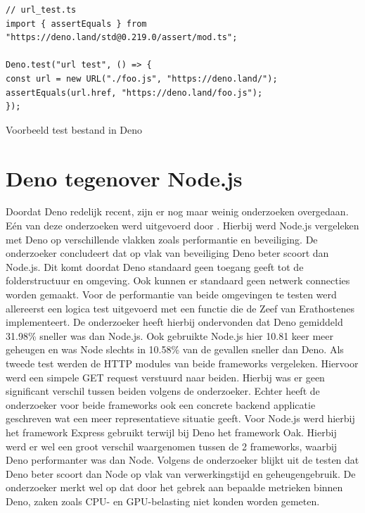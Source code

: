 \begin{listing}[H]
    \centering
    \begin{verbatim}
// url_test.ts
import { assertEquals } from "https://deno.land/std@0.219.0/assert/mod.ts";

Deno.test("url test", () => {
const url = new URL("./foo.js", "https://deno.land/");
assertEquals(url.href, "https://deno.land/foo.js");
});
        \end{verbatim}
        \caption{\label{list:test}Voorbeeld test bestand in Deno ~\autocite{DenoLand2023}} 
\end{listing}

\section{Deno tegenover Node.js}
Doordat Deno redelijk recent, zijn er nog maar weinig onderzoeken overgedaan. 
Eén van deze onderzoeken werd uitgevoerd door \textcite{VanKerkvoorde2021}.
Hierbij werd Node.js vergeleken met Deno op verschillende vlakken zoals performantie en beveiliging.
De onderzoeker concludeert dat op vlak van beveiliging Deno beter scoort dan Node.js. Dit komt doordat Deno
standaard geen toegang geeft tot de folderstructuur en omgeving. Ook kunnen er standaard geen netwerk connecties worden gemaakt.
Voor de performantie  van beide omgevingen te testen werd allereerst een logica test
uitgevoerd met een functie die de Zeef van Erathostenes implementeert. De onderzoeker heeft hierbij
ondervonden dat Deno gemiddeld 31.98\% sneller
was dan Node.js. Ook gebruikte Node.js hier 10.81 keer meer geheugen en was Node slechts in 10.58\% van de gevallen sneller dan Deno.
Als tweede test werden de HTTP modules van beide frameworks vergeleken.
Hiervoor werd een simpele GET request verstuurd naar beiden. Hierbij was er geen significant
verschil tussen beiden volgens de onderzoeker.
Echter heeft de onderzoeker voor beide frameworks ook een concrete backend applicatie geschreven wat een meer representatieve situatie geeft.
Voor Node.js werd hierbij het framework Express gebruikt terwijl bij Deno het framework Oak. Hierbij werd er wel een groot
verschil waargenomen tussen de 2 frameworks, waarbij Deno performanter was dan Node. Volgens de onderzoeker blijkt uit de testen dat Deno
beter scoort dan Node op vlak van verwerkingstijd en geheugengebruik. De onderzoeker merkt
wel op dat door het gebrek aan bepaalde metrieken binnen Deno, zaken zoals CPU- en GPU-belasting niet konden worden gemeten.



